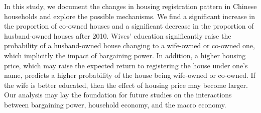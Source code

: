 \documentclass[11pt]{article}
\begin{document}
In this study, we document the changes in housing registration pattern in Chinese households and explore the possible mechanisms. We find a significant increase in the proportion of co-owned houses and a significant decrease in the proportion of husband-owned houses after 2010. Wives' education significantly raise the probability of a husband-owned house changing to a wife-owned or co-owned one, which implicitly the impact of bargaining power. In addition, a higher housing price, which may raise the expected return to registering the house under one's name, predicts a higher probability of the house being wife-owned or co-owned. If the wife is better educated, then the effect of housing price may become larger. Our analysis may lay the foundation for future studies on the interactions between bargaining power, household economy, and the macro economy.

\singlespacing
\setlength\bibsep{0pt}






\end{document}

